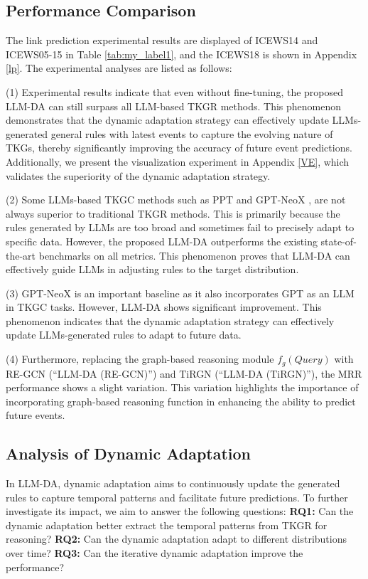 \documentclass{article}
\begin{document}
\subsection{Performance Comparison}
The link prediction experimental results are displayed of ICEWS14 and ICEWS05-15 in Table \ref{tab:my_label1}, and the ICEWS18 is shown in Appendix \ref{lp}. The experimental analyses are listed as follows:

(1) Experimental results indicate that even without fine-tuning, the proposed LLM-DA can still surpass all LLM-based TKGR methods. This phenomenon demonstrates that the dynamic adaptation strategy can effectively update LLMs-generated general rules with latest events to capture the evolving nature of TKGs, thereby significantly improving the accuracy of future event predictions. Additionally, we present the visualization experiment in Appendix \ref{VE}, which validates the superiority of the dynamic adaptation strategy. 

(2) Some LLMs-based TKGC methods such as PPT \citep{xu2023pre} and GPT-NeoX \citep{lee2023temporal}, are not always superior to traditional TKGR methods. This is primarily because the rules generated by LLMs are too broad and sometimes fail to precisely adapt to specific data. However, the proposed LLM-DA outperforms the existing state-of-the-art benchmarks on all metrics. This phenomenon proves that LLM-DA can effectively guide LLMs in adjusting rules to the target distribution.

(3) GPT-NeoX \citep{lee2023temporal} is an important baseline as it also incorporates GPT as an LLM in TKGC tasks. However, LLM-DA shows significant improvement. This phenomenon indicates that the dynamic adaptation strategy can effectively update LLMs-generated rules to adapt to future data.

(4) Furthermore, replacing the graph-based reasoning module $f_g(Query)$ with RE-GCN (``LLM-DA (RE-GCN)'') and TiRGN (``LLM-DA (TiRGN)''), the MRR performance shows a slight variation. 
This variation highlights the importance of incorporating graph-based reasoning function in enhancing the ability to predict future events. 

\subsection{Analysis of Dynamic Adaptation}
In LLM-DA, dynamic adaptation aims to continuously update the generated rules to capture temporal patterns and facilitate future predictions. To further investigate its impact, we aim to answer the following questions: \textbf{RQ1:} Can the dynamic adaptation better extract the temporal patterns from TKGR for reasoning? \textbf{RQ2:} Can the dynamic adaptation adapt to different distributions over time? \textbf{RQ3:} Can the iterative dynamic adaptation improve the performance? 
\end{document}
